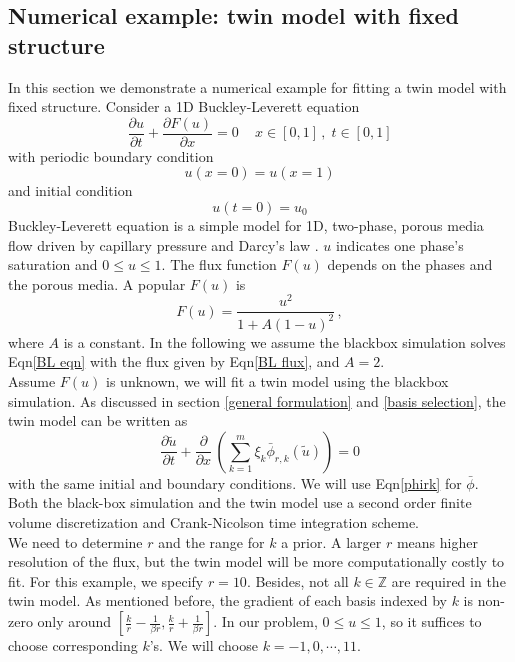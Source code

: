 \documentclass[a4paper,onecolumn]{article}
\theoremstyle{remark}
\begin{document}
\subsection{Numerical example: twin model with fixed structure}
\label{fixed numerical example}
In this section we demonstrate a numerical example for fitting a twin model with fixed structure.
Consider a 1D Buckley-Leverett equation
\begin{equation}
    \frac{\partial u}{\partial t} + \frac{\partial F(u)}{\partial x} = 0\,\quad x\in[0,1]\,,\; t\in[0,1]
    \label{BL eqn}
\end{equation}
with periodic boundary condition
\begin{equation}
    u(x=0) = u(x=1)
\end{equation}
and initial condition
\begin{equation}
    u(t=0) = u_0
\end{equation}
Buckley-Leverett equation is a simple model for 1D, two-phase, porous media flow driven by
capillary pressure and Darcy's law \cite{Buckley Leverett}. $u$
indicates one phase's saturation and $0\le u\le 1$.
The flux function $F(u)$ depends on the phases and the porous media. 
A popular $F(u)$ is
\begin{equation}
    F(u) = \frac{u^2}{1+A(1-u)^2}\,,
    \label{BL flux}
\end{equation}
where $A$ is a constant. In the following we assume the blackbox simulation
solves Eqn\eqref{BL eqn} with the flux given by Eqn\eqref{BL flux}, and $A=2$.
\\

\noindent Assume $F(u)$ is unknown, we will fit a twin model 
using the blackbox simulation.
As discussed in section \ref{general formulation} and
\ref{basis selection}, the twin model can be written as
\begin{equation}
    \frac{\partial \tilde{u}}{\partial t} + \frac{\partial}{\partial x}\,
    \left(\sum_{k=1}^m \xi_k \bar{\phi}_{r,k}(\tilde{u})\right) = 0
\end{equation}
with the same initial and boundary conditions. We will
use Eqn\eqref{phirk} for $\bar{\phi}$. Both the black-box simulation
and the twin model use a second order finite volume discretization and 
Crank-Nicolson time integration scheme.\\

\noindent We need to determine $r$ and the range for $k$ a prior. 
A larger $r$  means higher resolution of the flux, but the twin model will be
more computationally costly to fit. For this example,
we specify $r=10$. Besides, not all $k\in \mathbb{Z}$
are required in the twin model. As mentioned before, the gradient of
each basis indexed by $k$ is non-zero only around $[\frac{k}{r}-\frac{1}{\beta r},
\frac{k}{r}+\frac{1}{\beta r}]$. In our problem, $0\le u\le 1$, so it suffices
to choose corresponding $k$'s. We will choose $k=-1,0,\cdots, 11$.\\
\end{document}
